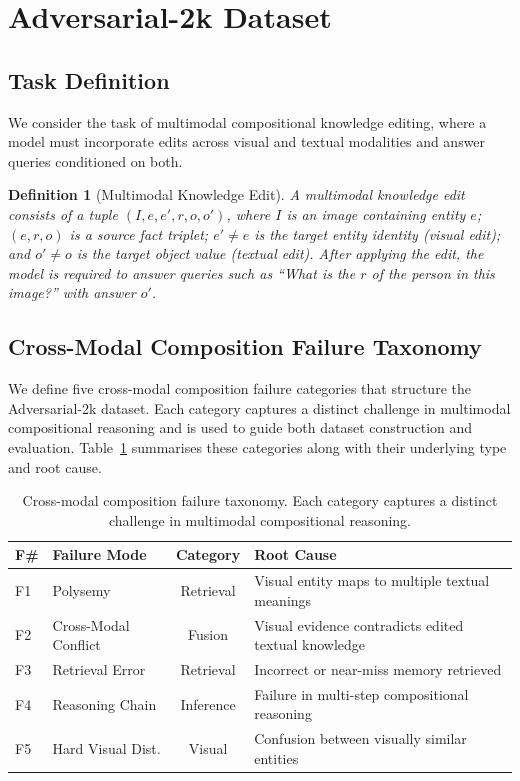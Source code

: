 \documentclass{article}
\newtheorem{definition}{Definition}
\begin{document}
\section{Adversarial-2k Dataset}

\subsection{Task Definition}
\label{sec:problem}

We consider the task of multimodal compositional knowledge editing, where a model must incorporate edits across visual and textual modalities and answer queries conditioned on both.

\begin{definition}[Multimodal Knowledge Edit]
A \emph{multimodal knowledge edit} consists of a tuple $(I, e, e', r, o, o')$, where $I$ is an image containing entity $e$; $(e, r, o)$ is a source fact triplet; $e' \neq e$ is the target entity identity (visual edit); and $o' \neq o$ is the target object value (textual edit). After applying the edit, the model is required to answer queries such as ``What is the $r$ of the person in this image?'' with answer $o'$.
\end{definition}


\subsection{Cross-Modal Composition Failure Taxonomy}
\label{sec:taxonomy}

We define five cross-modal composition failure categories that structure the Adversarial-2k dataset. Each category captures a distinct challenge in multimodal compositional reasoning and is used to guide both dataset construction and evaluation. Table~\ref{tab:taxonomy} summarises these categories along with their underlying type and root cause.

\begin{table}[t]
\centering
\caption{Cross-modal composition failure taxonomy. Each category captures a distinct challenge in multimodal compositional reasoning.}
\label{tab:taxonomy}
\small
\begin{tabular}{@{}llcl@{}}
\toprule
\textbf{F\#} & \textbf{Failure Mode} & \textbf{Category} & \textbf{Root Cause} \\
\midrule
F1 & Polysemy              & Retrieval & Visual entity maps to multiple textual meanings \\
F2 & Cross-Modal Conflict  & Fusion    & Visual evidence contradicts edited textual knowledge \\
F3 & Retrieval Error       & Retrieval & Incorrect or near-miss memory retrieved \\
F4 & Reasoning Chain       & Inference & Failure in multi-step compositional reasoning \\
F5 & Hard Visual Dist.     & Visual    & Confusion between visually similar entities \\
\bottomrule
\end{tabular}
\end{table}
\end{document}

